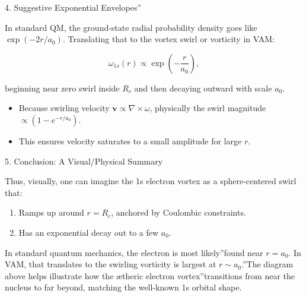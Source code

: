 4. Suggestive \grqq Exponential Envelopes\textquotedblright

In standard QM, the ground-state radial probability density goes like \(\exp(-2r/a_0)\). Translating that to the vortex swirl or vorticity in VAM:

\[
\omega_{1s}(r) \propto \exp\left(-\frac{r}{a_0}\right),
\]

beginning near zero swirl inside \(R_c\) and then decaying outward with scale \(a_0\).

\begin{itemize}
    \item Because swirling velocity \(\mathbf{v} \propto \nabla \times \omega\), physically the swirl magnitude \(\propto (1 - e^{-r/a_0})\).
    \item This ensures velocity saturates to a small amplitude for large \(r\).
\end{itemize}

5. Conclusion: A Visual/Physical Summary

Thus, visually, one can imagine the 1s electron vortex as a sphere-centered swirl that:

\begin{enumerate}
    \item Ramps up around \(r = R_c\), anchored by Coulombic constraints.
    \item Has an exponential decay out to a few \(a_0\).
\end{enumerate}

In standard quantum mechanics, the electron is \grqq most likely\textquotedblright found near \(r = a_0\). In VAM, that translates to \grqq the swirling vorticity is largest at \(r \sim a_0\).\textquotedblright The diagram above helps illustrate how the \grqq ætheric electron vortex\textquotedblright transitions from near the nucleus to far beyond, matching the well-known 1s orbital shape.